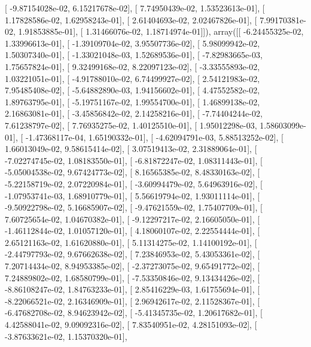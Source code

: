 \documentclass{article}
\begin{document}
       [ -9.87154028e-02,   6.15217678e-02],
       [  7.74950439e-02,   1.53523613e-01],
       [  1.17828586e-02,   1.62958243e-01],
       [  2.61404693e-02,   2.02467826e-01],
       [  7.99170381e-02,   1.91853885e-01],
       [  1.31466076e-02,   1.18714974e-01]]), array([[ -6.24455325e-02,   1.33996613e-01],
       [ -1.39109704e-02,   3.95507736e-02],
       [  5.98099942e-02,   1.50307340e-01],
       [ -1.33021048e-03,   1.52689536e-01],
       [ -7.82983665e-03,   1.75657824e-01],
       [  9.32499168e-02,   8.22097123e-02],
       [ -3.33555893e-02,   1.03221051e-01],
       [ -4.91788010e-02,   6.74499927e-02],
       [  2.54121983e-02,   7.95485408e-02],
       [ -5.64882890e-03,   1.94156602e-01],
       [  4.47552582e-02,   1.89763795e-01],
       [ -5.19751167e-02,   1.99554700e-01],
       [  1.46899138e-02,   2.16863081e-01],
       [ -3.45856842e-02,   2.14258216e-01],
       [ -7.74404244e-02,   7.61238797e-02],
       [  7.76935275e-02,   1.40125510e-01],
       [  1.95012298e-03,   1.58603099e-01],
       [ -1.47368117e-04,   1.65190332e-01],
       [ -4.62094791e-03,   5.88513252e-02],
       [  1.66013049e-02,   9.58615414e-02],
       [  3.07519413e-02,   2.31889064e-01],
       [ -7.02274745e-02,   1.08183550e-01],
       [ -6.81872247e-02,   1.08311443e-01],
       [ -5.05004538e-02,   9.67424773e-02],
       [  8.16565385e-02,   8.48330163e-02],
       [ -5.22158719e-02,   2.07220984e-01],
       [ -3.60994479e-02,   5.64963916e-02],
       [ -1.07953741e-03,   1.68910779e-01],
       [  5.56619794e-02,   1.93011114e-01],
       [ -9.50922798e-02,   5.16685907e-02],
       [ -9.47621559e-02,   1.75407709e-01],
       [  7.60725654e-02,   1.04670382e-01],
       [ -9.12297217e-02,   2.16605050e-01],
       [ -1.46112844e-02,   1.01057120e-01],
       [  4.18060107e-02,   2.22554444e-01],
       [  2.65121163e-02,   1.61620880e-01],
       [  5.11314275e-02,   1.14100192e-01],
       [ -2.44797793e-02,   9.67662638e-02],
       [  7.23846953e-02,   5.43053361e-02],
       [  7.20714434e-02,   8.94953385e-02],
       [ -2.37273075e-02,   9.65491772e-02],
       [  7.24889802e-02,   1.68580799e-01],
       [ -7.53350846e-02,   9.13434426e-02],
       [ -8.86108247e-02,   1.84763233e-01],
       [  2.85416229e-03,   1.61755694e-01],
       [ -8.22066521e-02,   2.16346909e-01],
       [  2.96942617e-02,   2.11528367e-01],
       [ -6.47682708e-02,   8.94623942e-02],
       [ -5.41345735e-02,   1.20617682e-01],
       [  4.42588041e-02,   9.09092316e-02],
       [  7.83540951e-02,   4.28151093e-02],
       [ -3.87633621e-02,   1.15370320e-01],
\end{document}
